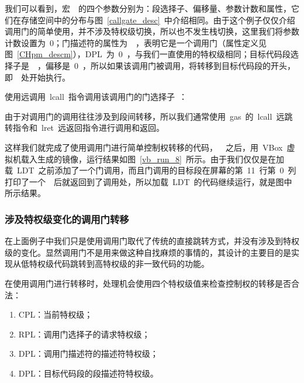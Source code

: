 我们可以看到，宏~~的四个参数分别为：段选择子、偏移量、参数计数和属性，它们在存储空间中的分布与图~\ref{callgate_desc}~中介绍相同。由于这个例子仅仅介绍调用门的简单使用，并不涉及特权级切换，所以也不发生栈切换，这里我们将参数计数设置为~0；门描述符的属性为~~，表明它是一个调用门（属性定义见图~\ref{CHpm_descm}），DPL~为~0~，与我们一直使用的特权级相同；目标代码段选择子是~~，偏移是~0~，所以如果该调用门被调用，将转移到目标代码段的开头，即~~处开始执行。

使用远调用~lcall~指令调用该调用门的门选择子~：

\label{CHpm_cg_call1}

由于对调用门的调用往往涉及到段间转移，所以我们通常使用~gas~的~lcall~远跳转指令和~lret~远返回指令进行调用和返回。

这样我们就完成了使用调用门进行简单控制权转移的代码，~~之后，用~VBox~虚拟机载入生成的镜像，运行结果如图~\ref{vb_run_8}~所示。由于我们仅仅是在加载~LDT~之前添加了一个门调用，而且门调用的目标段在屏幕的第~11~行第~0~列打印了一个~~后就返回到了调用处，所以加载~LDT~的代码继续运行，就是图中所示结果。


\subsubsection{涉及特权级变化的调用门转移}

在上面例子中我们只是使用调用门取代了传统的直接跳转方式，并没有涉及到特权级的变化。显然调用门不是用来做这种自找麻烦的事情的，其设计的主要目的是实现从低特权级代码跳转到高特权级的非一致代码的功能。

在使用调用门进行转移时，处理机会使用四个特权级值来检查控制权的转移是否合法：

\begin{enumerate}
\item CPL：当前特权级；
\item RPL：调用门选择子的请求特权级；
\item DPL：调用门描述符的描述符特权级；
\item DPL：目标代码段的段描述符特权级。
\end{enumerate}

